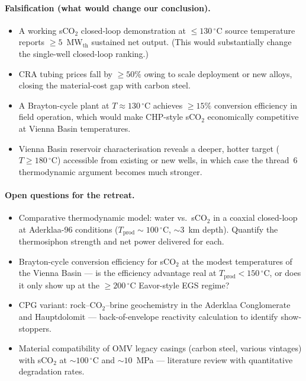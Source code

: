 \documentclass{article}
\begin{document}
\paragraph{Falsification (what would change our conclusion).}
\begin{itemize}
\item A working sCO$_2$ closed-loop demonstration at $\leq
130\,^\circ$C source temperature reports $\geq 5$~MW$_{\mathrm{th}}$
sustained net output. (This would substantially change the
single-well closed-loop ranking.)
\item CRA tubing prices fall by $\geq 50\%$ owing to scale
deployment or new alloys, closing the material-cost gap with
carbon steel.
\item A Brayton-cycle plant at $T \approx 130\,^\circ$C achieves
$\geq 15\%$ conversion efficiency in field operation, which would
make CHP-style sCO$_2$ economically competitive at Vienna Basin
temperatures.
\item Vienna Basin reservoir characterisation reveals a deeper,
hotter target ($T \geq 180\,^\circ$C) accessible from existing
or new wells, in which case the thread~6 thermodynamic argument
becomes much stronger.
\end{itemize}

\paragraph{Open questions for the retreat.}
\begin{itemize}
\item Comparative thermodynamic model: water vs.\ sCO$_2$ in a coaxial
closed-loop at Aderklaa-96 conditions ($T_{\mathrm{prod}}\sim 100$\,$^\circ$C,
$\sim 3$~km depth). Quantify the thermosiphon strength and net power
delivered for each.
\item Brayton-cycle conversion efficiency for sCO$_2$ at the modest
temperatures of the Vienna Basin --- is the efficiency advantage real
at $T_{\mathrm{prod}}<150\,^\circ$C, or does it only show up at the
$\geq 200\,^\circ$C Eavor-style EGS regime?
\item CPG variant: rock--CO$_2$--brine geochemistry in the Aderklaa
Conglomerate and Hauptdolomit --- back-of-envelope reactivity calculation
to identify show-stoppers.
\item Material compatibility of OMV legacy casings (carbon steel, various
vintages) with sCO$_2$ at $\sim 100\,^\circ$C and $\sim 10$~MPa ---
literature review with quantitative degradation rates.
\end{itemize}
\end{document}
